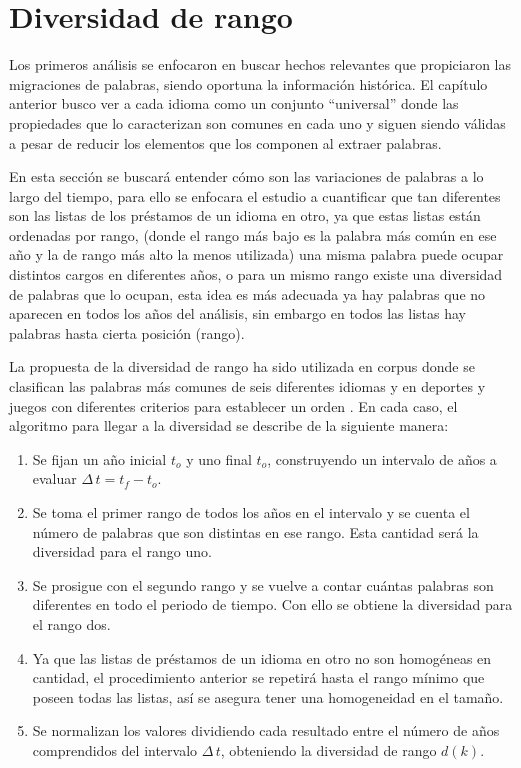 \chapter{Diversidad de rango}

Los primeros análisis se enfocaron en buscar hechos relevantes que propiciaron las migraciones de palabras,  siendo oportuna la información histórica.  El capítulo anterior busco ver a cada idioma como un conjunto “universal” donde las propiedades que lo caracterizan  son comunes en cada uno y siguen siendo válidas a pesar de reducir los elementos que los componen al extraer palabras. 

En esta sección se buscará entender cómo son las variaciones de palabras a  lo largo del tiempo, para ello  se enfocara el estudio a cuantificar que tan diferentes son las listas de los préstamos de un idioma en otro,  ya que estas listas están ordenadas por rango, (donde el rango más bajo es la palabra más común en ese año y la de rango más alto la menos utilizada)  una misma palabra puede ocupar distintos cargos en diferentes años,  o  para un mismo rango existe una diversidad de palabras que lo ocupan, esta idea es más adecuada ya hay palabras que no  aparecen en todos los años del análisis,  sin embargo en todos las listas  hay palabras hasta cierta posición (rango).   

La propuesta de la diversidad de rango ha sido utilizada en corpus donde se clasifican las palabras más comunes de seis diferentes idiomas \cite{tesis.sergio} y en deportes y juegos con diferentes criterios para establecer un orden \cite{tesis.jama}. En cada caso,  el algoritmo para llegar a la diversidad se describe de la siguiente manera:


\begin{enumerate}
	
	\item Se fijan un año inicial $t_{o}$ y uno final $t_{o}$, construyendo un intervalo de años a evaluar $\Delta\,t = t_{f}- t_{o}$.
	
	\item Se toma el primer rango de todos los años en el intervalo y se cuenta el número de palabras que son distintas en ese rango. Esta cantidad será la diversidad para el rango uno.
	
	\item Se prosigue con el segundo rango y se vuelve a contar cuántas palabras son diferentes en todo el periodo de tiempo.  Con ello se obtiene la diversidad para el rango dos. 
	
	\item Ya que las listas de préstamos de un idioma en otro no son homogéneas en cantidad, el procedimiento anterior se repetirá hasta el rango mínimo que poseen todas las listas,  así se asegura tener una homogeneidad en el tamaño.
	
	\item Se normalizan  los valores dividiendo cada resultado entre el número de años comprendidos del intervalo $\Delta\,t$, obteniendo  la diversidad de rango $d(k)$.
	
	
\end{enumerate}


